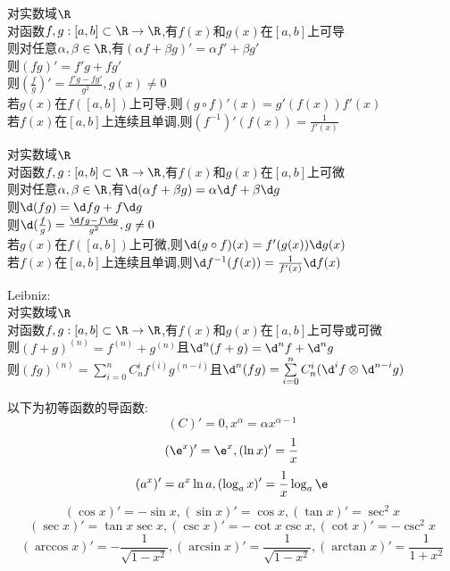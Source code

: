 \begin{dingli}
对实数域$\R$\\
对函数$f,g:[a,b]\subset \R \to \R$,有$f(x)$和$g(x)$在$[a,b]$上可导\\
则对任意$\alpha,\beta\in\R$,有$(\alpha f+\beta g)'=\alpha f'+\beta g'$\\
则$(fg)'=f'g+fg'$\\
则$(\frac{f}{g})'=\frac{f'g-fg'}{g^2},g(x)\neq 0$\\
若$g(x)$在$f([a,b])$上可导,则$(g\circ f)'(x)=g'(f(x))f'(x)$\\
若$f(x)$在$[a,b]$上连续且单调,则$(f^{-1})'(f(x))=\frac{1}{f'(x)}$
\end{dingli}

\begin{dingli}
对实数域$\R$\\
对函数$f,g:[a,b]\subset \R \to \R$,有$f(x)$和$g(x)$在$[a,b]$上可微\\
则对任意$\alpha,\beta\in\R$,有$\d(\alpha f+\beta g)=\alpha \d f+\beta \d g$\\
则$\d(fg)=\d fg+f\d g$\\
则$\d(\frac{f}{g})=\frac{\d fg-f\d g}{g^2},g\neq 0$\\
若$g(x)$在$f([a,b])$上可微,则$\d (g\circ f)(x)=f'(g(x))\d g(x)$\\
若$f(x)$在$[a,b]$上连续且单调,则$\d f^{-1}(f(x))=\frac{1}{f'(x)}\d f(x)$
\end{dingli}

\begin{dingli}
Leibniz:\\
对实数域$\R$\\
对函数$f,g:[a,b]\subset \R \to \R$,有$f(x)$和$g(x)$在$[a,b]$上可导或可微\\
则$(f+g)^{(n)}=f^{(n)}+g^{(n)}$且$\d^{n}(f+g)=\d^{n}f+\d^{n}g$\\
则$(fg)^{(n)}=\sum\limits_{i=0}^{n}C_{n}^{i}f^{(i)}g^{(n-i)}$且$\d^{n}(fg)=\sum\limits_{i=0}^{n}C_{n}^{i}(\d^{i}f\otimes\d^{n-i}g)$
\end{dingli}

\begin{zhu}
以下为初等函数的导函数:\\
\[(C)'=0,x^{\alpha}=\alpha x^{\alpha-1}\]
\[(\e^{x})'=\e^{x},(\ln x)'=\frac{1}{x}\]
\[(a^x)'=a^x\ln a,(\log_{a}x)'=\frac{1}{x}\log_{a}\e\]
\[(\cos x)'=-\sin x,(\sin x)'=\cos x,(\tan x)'=\sec^2 x\]
\[(\sec x)'=\tan x\sec x,(\csc x)'=-\cot x\csc x,(\cot x)'=-\csc^2 x\]
\[(\arccos x)'=-\frac{1}{\sqrt{1-x^2}},(\arcsin x)'=\frac{1}{\sqrt{1-x^2}},(\arctan x)'=\frac{1}{1+x^2}\]
\end{zhu}

